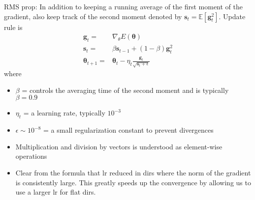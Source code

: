 \documentclass[norsk,a4paper,11pt]{article}
\begin{document}
\begin{itemize}
		RMS prop: In addition to keeping a running average of the first moment of the gradient, also keep track of the second moment denoted by $\mathbf{s}_t = \mathbb{E}[\mathbf{g}_t^2]$. Update rule is
		\begin{align}
			\mathbf{g}_t =& \nabla_\theta E(\bm{\theta}) \\
			\mathbf{s}_t =& \beta \mathbf{s}_{t-1} + (1-\beta)\mathbf{g}_t^2 \\
			\bm{\theta}_{t+1} =& \bm{\theta}_t - \eta_t \frac{\mathbf{g}_t}{\sqrt{\mathbf{s}_t + \epsilon}}
		\end{align}
		where
		\begin{itemize} 
			\item $\beta$ = controls the averaging time of the second moment and is typically $\beta=0.9$
			\item $\eta_t$ = a learning rate, typically $10^{-3}$
			\item $\epsilon \sim 10^{-8}$ = a small regularization constant to prevent divergences
			\item Multiplication and division by vectors is understood as element-wise operations
			\item Clear from the formula that lr reduced in dirs where the norm of the gradient is consistently large. This greatly speeds up the convergence by allowing us to use a larger lr for flat dirs. 
		\end{itemize}


\end{itemize}
\end{document}
